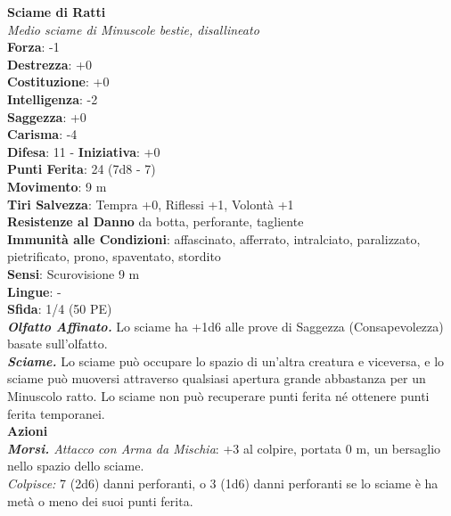 \begin{multicols}{2}
\medskip\textbf{Sciame di Ratti}\\
\emph{Medio sciame di Minuscole bestie, disallineato}\\
\textbf{Forza}: -1\\
\textbf{Destrezza}: +0\\
\textbf{Costituzione}: +0\\
\textbf{Intelligenza}: -2\\
\textbf{Saggezza}: +0\\
\textbf{Carisma}: -4\\
\textbf{Difesa}: 11 - \textbf{Iniziativa}: +0\\
\textbf{Punti Ferita}: 24 (7d8 - 7)\\
\textbf{Movimento}: 9 m\\
\textbf{Tiri Salvezza}: Tempra +0, Riflessi +1, Volontà +1\\
\textbf{Resistenze al Danno} da botta, perforante, tagliente\\
\textbf{Immunità alle Condizioni}: affascinato, afferrato, intralciato, paralizzato, pietrificato, prono, spaventato, stordito\\
\textbf{Sensi}: Scurovisione 9 m\\
\textbf{Lingue}: -\\
\textbf{Sfida}: 1/4 (50 PE)\smallskip\\
\emph{\textbf{Olfatto Affinato.}} Lo sciame ha +1d6 alle prove di Saggezza (Consapevolezza) basate sull'olfatto.\\
\emph{\textbf{Sciame.}} Lo sciame può occupare lo spazio di un'altra creatura e viceversa, e lo sciame può muoversi attraverso qualsiasi apertura grande abbastanza per un Minuscolo ratto. Lo sciame non può recuperare punti ferita né ottenere punti ferita temporanei.\\
\smallskip\textbf{Azioni}\\
\emph{\textbf{Morsi.} Attacco con Arma da Mischia}: +3 al colpire, portata 0 m, un bersaglio nello spazio dello sciame.\\
\emph{Colpisce:} 7 (2d6) danni perforanti, o 3 (1d6) danni perforanti se lo sciame è ha metà o meno dei suoi punti ferita.\\


\end{multicols}
